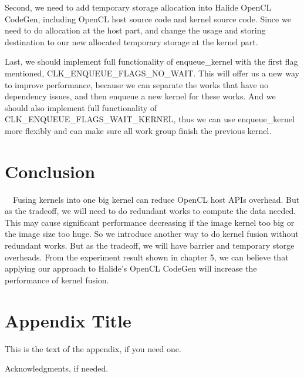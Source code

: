 \documentclass{sigplanconf}
\begin{document}
    Second, we need to add temporary storage allocation into Halide OpenCL CodeGen, including OpenCL host source code and kernel source code. Since we need to do allocation at the host part, and change the usage and storing destination to our new allocated temporary storage at the kernel part.

    Last, we should implement full functionality of enqueue\_kernel with the first flag mentioned, CLK\_ENQUEUE\_FLAGS\_NO\_WAIT. This will offer us a new way to improve performance, because we can separate the works that have no dependency issues, and then enqueue a new kernel for these works. And we should also implement full functionality of CLK\_ENQUEUE\_FLAGS\_WAIT\_KERNEL, thus we can use enqueue\_kernel more flexibly and can make sure all work group finish the previous kernel.
    
\section{Conclusion}
\quad\ \ Fusing kernels into one big kernel can reduce OpenCL host APIs overhead. But as the tradeoff, we will need to do redundant works to compute the data needed. This may cause significant performance decreasing if the image kernel too big or the image size too huge. So we introduce another way to do kernel fusion without redundant works. But as the tradeoff, we will have barrier and temporary storge overheads. From the experiment result shown in chapter 5, we can believe that applying our approach to Halide's OpenCL CodeGen will increase the performance of kernel fusion.


\appendix
\section{Appendix Title}

This is the text of the appendix, if you need one.

\acks

Acknowledgments, if needed.


\nocite{*}





%


\end{document}
